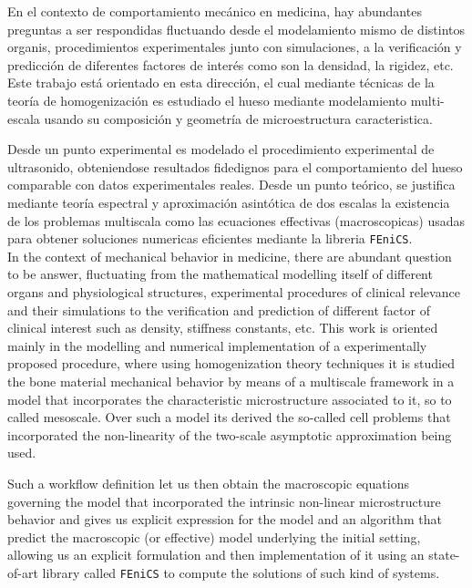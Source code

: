 \begin{intro}

En el contexto de comportamiento mecánico en medicina, hay abundantes preguntas a ser respondidas fluctuando desde el modelamiento mismo de distintos organis, procedimientos experimentales junto con simulaciones, a la verificación y predicción de diferentes factores de interés como son la densidad, la rigidez, etc. Este trabajo está orientado en esta dirección, el cual mediante técnicas de la teoría de homogenización es estudiado el hueso mediante modelamiento multi-escala usando su composición y geometría de microestructura caracteristica.

Desde un punto experimental es modelado el procedimiento experimental de ultrasonido, obteniendose resultados fidedignos para el comportamiento del hueso comparable con datos experimentales reales. 
Desde un punto teórico, se justifica mediante teoría espectral y aproximación asintótica de dos escalas la existencia de los problemas multiscala como las ecuaciones effectivas (macroscopicas) usadas para obtener soluciones numericas eficientes mediante la libreria \texttt{FEniCS}.
\\

In the context of mechanical behavior in medicine, there are abundant question to be answer, fluctuating from the mathematical modelling itself of different organs and physiological structures, experimental procedures of clinical relevance and their simulations to the verification and prediction of different factor of clinical interest such as density, stiffness constants, etc. 
This work is oriented mainly in the modelling and numerical implementation of a experimentally proposed procedure, where using homogenization theory techniques it is studied the bone material mechanical behavior by means of a multiscale framework in a model that incorporates the characteristic microstructure associated to it, so to called mesoscale.
Over such a model its derived the so-called cell problems that incorporated the non-linearity of the two-scale asymptotic approximation being used.

Such a workflow definition let us then obtain the macroscopic equations governing the model that incorporated the intrinsic non-linear microstructure behavior and gives us explicit expression for the model and an algorithm that predict the macroscopic (or effective) model underlying the initial setting, allowing us an explicit formulation and then implementation of it using an state-of-art library called \texttt{FEniCS} to compute the solutions of such kind of systems.


\end{intro}
